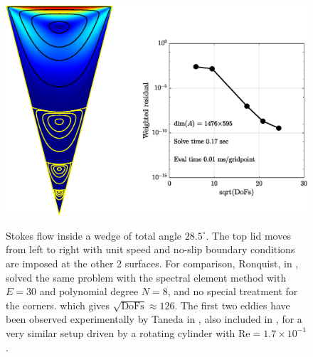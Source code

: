 \begin{figure}[H]
	\centering
	\includegraphics[width=\linewidth]{Figures/wedge}
	\label{fig:wedge}
	\caption{Stokes flow inside a wedge of total angle $28.5^\circ$. The top lid moves from left to right with unit speed and no-slip boundary conditions are imposed at the other 2 surfaces. For comparison, Ronquist, in \cite[Fig.~12]{Ronquist88}, solved the same problem with the spectral element method with $E=30$ and polynomial degree $N=8$, and no special treatment for the corners. which gives $\sqrt{\text{DoFs}}\approx 126$. The first two eddies have been observed experimentally by Taneda in \cite[Fig.~19]{Taneda79}, also included in \cite[Fig.~10]{VanDyke82}, for a very similar setup driven by a rotating cylinder with $\text{Re}=1.7\times10^{-1}$.}
\end{figure} 

